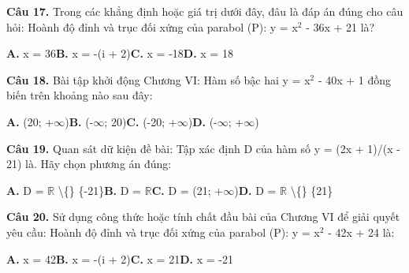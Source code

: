 \documentclass[11pt,a4paper]{article}
\begin{document}
\textbf{\color{primary} Câu 17.} Trong các khẳng định hoặc giá trị dưới đây, đâu là đáp án đúng cho câu hỏi: Hoành độ đỉnh và trục đối xứng của parabol (P): y = x$^2$ - 36x + 21 là?\par
\hspace*{1.5em}\textbf{A.} x = 36\quad\quad \textbf{B.} x = -(i + 2)\quad\quad \textbf{C.} x = -18\quad\quad \textbf{D.} x = 18\par\vspace{2pt}
\textbf{\color{primary} Câu 18.} Bài tập khởi động Chương VI: Hàm số bậc hai y = x$^2$ - 40x + 1 đồng biến trên khoảng nào sau đây:\par
\hspace*{1.5em}\textbf{A.} (20; +$\infty$)\quad\quad \textbf{B.} (-$\infty$; 20)\quad\quad \textbf{C.} (-20; +$\infty$)\quad\quad \textbf{D.} (-$\infty$; +$\infty$)\par\vspace{2pt}
\textbf{\color{primary} Câu 19.} Quan sát dữ kiện đề bài: Tập xác định D của hàm số y = (2x + 1)/(x - 21) là. Hãy chọn phương án đúng:\par
\hspace*{1.5em}\textbf{A.} D = $\mathbb{R}$ \textbackslash\{\} \{-21\}\quad\quad \textbf{B.} D = $\mathbb{R}$\quad\quad \textbf{C.} D = (21; +$\infty$)\quad\quad \textbf{D.} D = $\mathbb{R}$ \textbackslash\{\} \{21\}\par\vspace{2pt}
\textbf{\color{primary} Câu 20.} Sử dụng công thức hoặc tính chất đầu bài của Chương VI để giải quyết yêu cầu: Hoành độ đỉnh và trục đối xứng của parabol (P): y = x$^2$ - 42x + 24 là:\par
\hspace*{1.5em}\textbf{A.} x = 42\quad\quad \textbf{B.} x = -(i + 2)\quad\quad \textbf{C.} x = 21\quad\quad \textbf{D.} x = -21\par\vspace{2pt}
\end{document}
